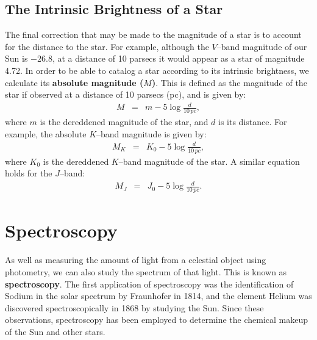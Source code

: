\subsection{The Intrinsic Brightness of a Star}
\label{cha:InfraredDataReductionTechniques:sec:MagnitudeScale:subsec:AbsoluteMagnitude}

The final correction that may be made to the magnitude of a star is to
account for the distance to the star. For example, although the $V$--band magnitude of our Sun is $-26.8$, at a distance of 10 parsecs it would
appear as a star of magnitude 4.72. In order to be able to catalog a star according
to its intrinsic brightness, we calculate its \textbf{absolute
magnitude ($M$)}. This is defined as the magnitude of the star if observed at a distance
of 10 parsecs (pc), and is given by:
\begin{eqnarray}
\label{cha:InfraredDataReductionTechniques:sec:MagnitudeScale:subsec:AbsoluteMagnitude:eqn:AbsMag}
M & = & m - 5 \log{\frac{d}{10\,pc}},
\end{eqnarray}
where $m$ is the dereddened magnitude of the star, and $d$ is its
distance. For example, the absolute $K$--band magnitude is given by:
\begin{eqnarray}
\label{cha:InfraredDataReductionTechniques:sec:MagnitudeScale:subsec:AbsoluteMagnitude:eqn:AbsMagK}
M_K & = & K_0 - 5 \log{\frac{d}{10\,pc}},
\end{eqnarray}
where $K_0$ is the dereddened $K$--band magnitude of the star. A
similar equation holds for the $J$--band:
\begin{eqnarray}
\label{cha:InfraredDataReductionTechniques:sec:MagnitudeScale:subsec:AbsoluteMagnitude:eqn:AbsMagJ}
M_J & = & J_0 - 5 \log{\frac{d}{10\,pc}}.
\end{eqnarray}


\section{Spectroscopy}
\label{cha:InfraredDataReductionTechniques:sec:Spectroscopy}

As well as measuring the amount of light from a celestial object using
photometry, we can also study the spectrum of that light. This is
known as \textbf{spectroscopy}. The first application of spectroscopy was the identification of Sodium
in the solar spectrum by Fraunhofer in 1814, and the element Helium was discovered spectroscopically in 1868 by studying the Sun. Since
these observations, spectroscopy has been employed to determine the
chemical makeup of the Sun and other stars. %


